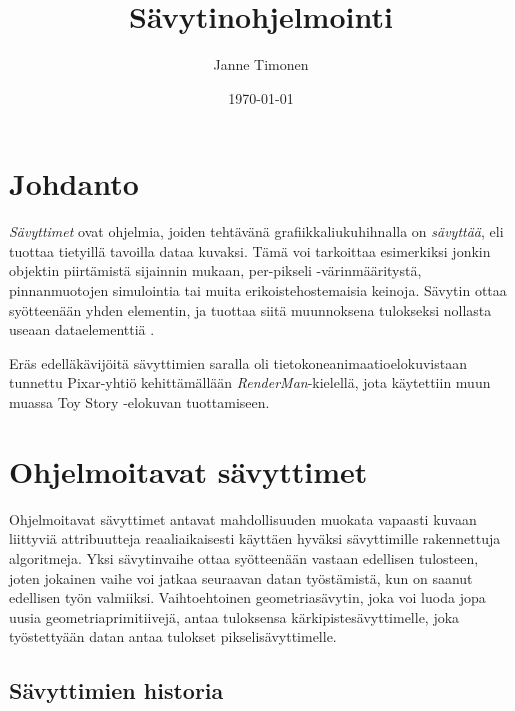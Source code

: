 \documentclass[finnish]{tktltiki2}
\title{Sävytinohjelmointi}
\author{Janne Timonen}
\date{\today}
\theoremstyle{definition}
\theoremstyle{remark}
\begin{document}

\frontmatter      %

\maketitle        %
\makeabstract     %

\tableofcontents  %


\mainmatter       %

\section{Johdanto}


\emph{Sävyttimet} ovat ohjelmia, joiden tehtävänä grafiikkaliukuhihnalla on \emph{sävyttää}, eli tuottaa tietyillä tavoilla dataa kuvaksi. Tämä voi tarkoittaa esimerkiksi jonkin objektin piirtämistä sijainnin mukaan, per-pikseli -värinmääritystä, pinnanmuotojen simulointia tai muita erikoistehostemaisia keinoja. Sävytin ottaa syötteenään yhden elementin, ja tuottaa siitä muunnoksena tulokseksi nollasta useaan dataelementtiä \cite{Gre14}. 

Eräs edelläkävijöitä sävyttimien saralla oli tietokoneanimaatioelokuvistaan tunnettu Pixar-yhtiö kehittämällään \emph{RenderMan}-kielellä, jota käytettiin muun muassa Toy Story -elokuvan tuottamiseen.

\section{Ohjelmoitavat sävyttimet}

Ohjelmoitavat sävyttimet antavat mahdollisuuden muokata vapaasti kuvaan liittyviä attribuutteja reaaliaikaisesti käyttäen hyväksi sävyttimille rakennettuja algoritmeja. Yksi sävytinvaihe ottaa syötteenään vastaan edellisen tulosteen, joten jokainen vaihe voi jatkaa seuraavan datan työstämistä, kun on saanut edellisen työn valmiiksi. Vaihtoehtoinen geometriasävytin, joka voi luoda jopa uusia geometriaprimitiivejä, antaa tuloksensa kärkipistesävyttimelle, joka työstettyään datan antaa tulokset pikselisävyttimelle.

\subsection{Sävyttimien historia}
\end{document}
